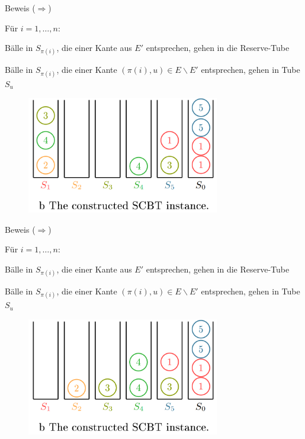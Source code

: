 \documentclass{beamer}
\begin{document}
\begin{frame}{Beweis (\glqq $\Rightarrow$\grqq)}
\begin{pointlist}
\item Für $i=1,\dots,n$:
\begin{arrowlist}
\item Bälle in $S_{\pi(i)}$, die einer Kante aus $E'$ entsprechen, gehen in die Reserve-Tube 
\item Bälle in $S_{\pi(i)}$, die einer Kante $(\pi(i),u)\in E\backslash E'$ entsprechen, gehen in Tube $S_u$
\end{arrowlist}
\end{pointlist}
\begin{figure}
    \centering
    \includegraphics[width=0.75\textwidth]{proofr2}
\end{figure}
\end{frame}

\begin{frame}{Beweis (\glqq $\Rightarrow$\grqq)}
\begin{pointlist}
\item Für $i=1,\dots,n$:
\begin{arrowlist}
\item Bälle in $S_{\pi(i)}$, die einer Kante aus $E'$ entsprechen, gehen in die Reserve-Tube 
\item Bälle in $S_{\pi(i)}$, die einer Kante $(\pi(i),u)\in E\backslash E'$ entsprechen, gehen in Tube $S_u$
\end{arrowlist}
\end{pointlist}
\begin{figure}
    \centering
    \includegraphics[width=0.75\textwidth]{proofr3}
\end{figure}
\end{frame}
\end{document}
